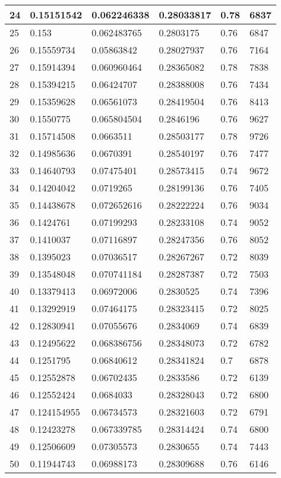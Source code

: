 \begin{longtable}{|l|l|l|l|l|l|}
24 & 0.15151542 & 0.062246338 & 0.28033817 & 0.78 & 6837 \\ \hline 
25 & 0.153 & 0.062483765 & 0.2803175 & 0.76 & 6847 \\ \hline 
26 & 0.15559734 & 0.05863842 & 0.28027937 & 0.76 & 7164 \\ \hline 
27 & 0.15914394 & 0.060960464 & 0.28365082 & 0.78 & 7838 \\ \hline 
28 & 0.15394215 & 0.06424707 & 0.28388008 & 0.76 & 7434 \\ \hline 
29 & 0.15359628 & 0.06561073 & 0.28419504 & 0.76 & 8413 \\ \hline 
30 & 0.1550775 & 0.065804504 & 0.2846196 & 0.76 & 9627 \\ \hline 
31 & 0.15714508 & 0.0663511 & 0.28503177 & 0.78 & 9726 \\ \hline 
32 & 0.14985636 & 0.0670391 & 0.28540197 & 0.76 & 7477 \\ \hline 
33 & 0.14640793 & 0.07475401 & 0.28573415 & 0.74 & 9672 \\ \hline 
34 & 0.14204042 & 0.0719265 & 0.28199136 & 0.76 & 7405 \\ \hline 
35 & 0.14438678 & 0.072652616 & 0.28222224 & 0.76 & 9034 \\ \hline 
36 & 0.1424761 & 0.07199293 & 0.28233108 & 0.74 & 9052 \\ \hline 
37 & 0.1410037 & 0.07116897 & 0.28247356 & 0.76 & 8052 \\ \hline 
38 & 0.1395023 & 0.07036517 & 0.28267267 & 0.72 & 8039 \\ \hline 
39 & 0.13548048 & 0.070741184 & 0.28287387 & 0.72 & 7503 \\ \hline 
40 & 0.13379413 & 0.06972006 & 0.2830525 & 0.74 & 7396 \\ \hline 
41 & 0.13292919 & 0.07464175 & 0.28323415 & 0.72 & 8025 \\ \hline 
42 & 0.12830941 & 0.07055676 & 0.2834069 & 0.74 & 6839 \\ \hline 
43 & 0.12495622 & 0.068386756 & 0.28348073 & 0.72 & 6782 \\ \hline 
44 & 0.1251795 & 0.06840612 & 0.28341824 & 0.7 & 6878 \\ \hline 
45 & 0.12552878 & 0.06702435 & 0.2833586 & 0.72 & 6139 \\ \hline 
46 & 0.12552424 & 0.0684033 & 0.28328043 & 0.72 & 6800 \\ \hline 
47 & 0.124154955 & 0.06734573 & 0.28321603 & 0.72 & 6791 \\ \hline 
48 & 0.12423278 & 0.067339785 & 0.28314424 & 0.74 & 6800 \\ \hline 
49 & 0.12506609 & 0.07305573 & 0.2830655 & 0.74 & 7443 \\ \hline 
50 & 0.11944743 & 0.06988173 & 0.28309688 & 0.76 & 6146 \\ \hline 
\end{longtable}